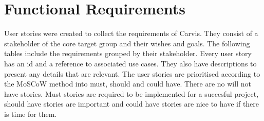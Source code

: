 \chapter{Functional Requirements}
User stories were created to collect the requirements of Carvis. They consist of a stakeholder of the core target group and their wishes and goals. The following tables include the requirements grouped by their stakeholder. Every user story has an id and a reference to associated use cases. They also have descriptions to present any details that are relevant. The user stories are prioritised according to the MoSCoW method into must, should and could have. There are no will not have stories. Must stories are required to be implemented for a succesful project, should have stories are important and could have stories are nice to have if there is time for them. 

